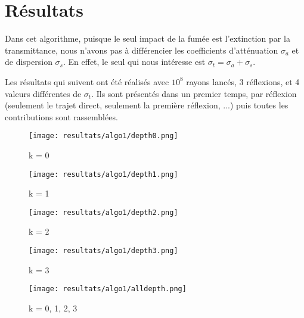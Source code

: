 \section{Résultats}

Dans cet algorithme, puisque le seul impact de la fumée est l'extinction par la transmittance, nous n'avons pas à différencier les coefficients d'atténuation $\sigma_a$ et de dispersion $\sigma_s$. En effet, le seul qui nous intéresse est $\sigma_t = \sigma_a + \sigma_s$.\par
Les résultats qui suivent ont été réalisés avec $10^8$ rayons lancés, 3 réflexions, et 4 valeurs différentes de $\sigma_t$. Ils sont présentés dans un premier temps, par réflexion (seulement le trajet direct, seulement la première réflexion, ...) puis toutes les contributions sont rassemblées.

\begin{center}
\begin{figure}[h!]
      \texttt{[image: resultats/algo1/depth0.png]}
      \caption{k = 0}
\end{figure}
\begin{figure}[h!]
      \texttt{[image: resultats/algo1/depth1.png]}
      \caption{k = 1}
\end{figure}
\begin{figure}[h!]
      \texttt{[image: resultats/algo1/depth2.png]}
      \caption{k = 2}
\end{figure}
\begin{figure}[h!]
      \texttt{[image: resultats/algo1/depth3.png]}
      \caption{k = 3}
\end{figure}
\begin{figure}[h!]
      \texttt{[image: resultats/algo1/alldepth.png]}
      \caption{k = 0, 1, 2, 3}
\end{figure}
\end{center}